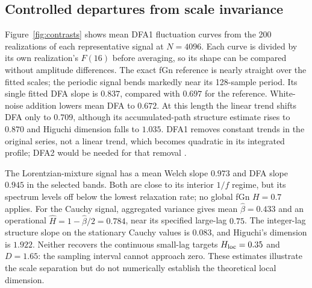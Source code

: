 \documentclass[12pt,twocolumn]{article}
\begin{document}
\begin{table}[t]
\caption{Eight paired identities for Davies--Harte synthesis: mean residual across 36 parameter combinations and number rejecting zero after Bonferroni correction over 576 tests. Each residual is the left side minus the right side.}
\label{tab:allrelations}
\centering\small
{}
\end{table}

\subsection{Controlled departures from scale invariance}

Figure~\ref{fig:contrasts} shows mean DFA1 fluctuation curves from the 200 realizations of each representative signal at $N=4096$. Each curve is divided by its own realization's $F(16)$ before averaging, so its shape can be compared without amplitude differences. The exact fGn reference is nearly straight over the fitted scales; the periodic signal bends markedly near its 128-sample period. Its single fitted DFA slope is $0.837$, compared with $0.697$ for the reference. White-noise addition lowers mean DFA to $0.672$. At this length the linear trend shifts DFA only to $0.709$, although its accumulated-path structure estimate rises to $0.870$ and Higuchi dimension falls to $1.035$. DFA1 removes constant trends in the original series, not a linear trend, which becomes quadratic in its integrated profile; DFA2 would be needed for that removal \cite{kantelhardt2002}.

The Lorentzian-mixture signal has a mean Welch slope $0.973$ and DFA slope $0.945$ in the selected bands. Both are close to its interior $1/f$ regime, but its spectrum levels off below the lowest relaxation rate; no global fGn $H=0.7$ applies. For the Cauchy signal, aggregated variance gives mean $\widehat\beta=0.433$ and an operational $\widehat H=1-\widehat\beta/2=0.784$, near its specified large-lag $0.75$. The integer-lag structure slope on the stationary Cauchy values is $0.083$, and Higuchi's dimension is $1.922$. Neither recovers the continuous small-lag targets $H_{\rm loc}=0.35$ and $D=1.65$: the sampling interval cannot approach zero. These estimates illustrate the scale separation but do not numerically establish the theoretical local dimension.
\end{document}
